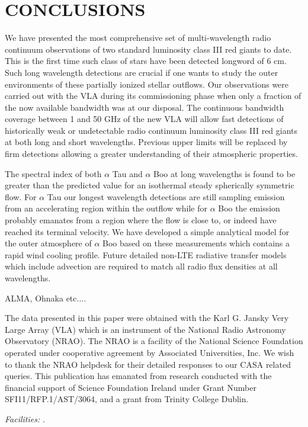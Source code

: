 \documentclass[iop]{emulateapj}
\begin{document}
\section{CONCLUSIONS}
We have presented the most comprehensive set of multi-wavelength radio continuum observations of two standard luminosity class III red giants to date. This is the first time such class of stars have been detected longword of 6 cm. Such long wavelength detections are crucial if one wants to study the outer environments of these partially ionized stellar outflows. Our observations were carried out with the VLA during its commissioning phase when only a fraction of the now available bandwidth was at our disposal. The continuous bandwidth coverage between 1 and 50 GHz of the new VLA will allow fast detections of historically weak or undetectable radio continuum luminosity class III red giants at both long and short wavelengths. Previous upper limits will be replaced by firm detections allowing a greater understanding of their atmospheric properties.

The spectral index of both $\alpha$ Tau and $\alpha$ Boo at long wavelengths is found to be greater than the predicted value for an isothermal steady spherically symmetric flow. For $\alpha$ Tau our longest wavelength detections are still sampling emission from an accelerating region within the outflow while for $\alpha$ Boo the emission probably emanates from a region where the flow is close to, or indeed have reached its terminal velocity. We have developed a simple analytical model for the outer atmosphere of $\alpha$ Boo based on these measurements which contains a rapid wind cooling profile. Future detailed non-LTE radiative transfer models which include advection are required to match all radio flux densities at all wavelengths. 

ALMA, Ohnaka etc....

\acknowledgments
The data presented in this paper were obtained with the Karl G. Jansky Very Large Array (VLA) which is an instrument of the National Radio Astronomy Observatory (NRAO). The NRAO is a facility of the National Science Foundation operated under cooperative agreement by Associated Universities, Inc. We wish to thank the NRAO helpdesk for their detailed responses to our CASA related queries. This publication has emanated from research conducted with the financial support of Science Foundation Ireland under Grant Number SFI11/RFP.1/AST/3064, and a grant from Trinity College Dublin.

{\it Facilities:} .




\end{document}
